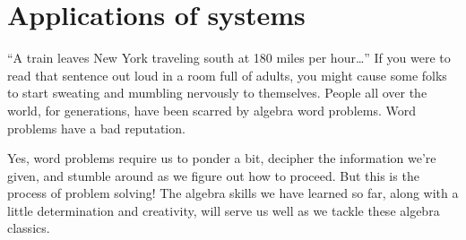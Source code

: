 %
%
%
%
%

\section{Applications of systems}
\label{sec:sysapplications}

``A train leaves New York traveling south at 180 miles per hour\ldots'' If you were to read that sentence out loud in a room full of adults, you might cause some folks to start sweating and mumbling nervously to themselves. People all over the world, for generations, have been scarred by algebra word problems. Word problems have a bad reputation.

Yes, word problems require us to ponder a bit, decipher the information we're given, and stumble around as we figure out how to proceed. But this is the process of problem solving! The algebra skills we have learned so far, along with a little determination and creativity, will serve us well as we tackle these algebra classics.

